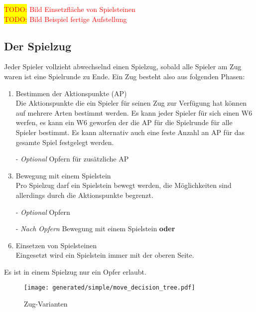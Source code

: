 \documentclass{article}
\newcommand{\todo}[1]{\textcolor{red}{\colorbox{yellow}{TODO:} #1\\}}
\begin{document}
	\todo{Bild Einsetzfläche von Spielsteinen}
	\todo{Bild Beispiel fertige Aufstellung}
	
\subsection{Der Spielzug}

	
	Jeder Spieler vollzieht abwechselnd einen Spielzug, sobald alle Spieler am Zug waren
	ist eine Spielrunde zu Ende. Ein Zug besteht also aus folgenden Phasen:

	
	
	\begin{enumerate}
	\item Bestimmen der Aktionspunkte (AP) \\
		  Die Aktionspunkte die ein Spieler für seinen Zug zur Verfügung hat können auf mehrere Arten bestimmt werden.
		  Es kann jeder Spieler für sich einen W6 werfen, es kann ein W6 geworfen der die AP für die Spielrunde für alle Spieler bestimmt.
		  Es kann alternativ auch eine feste Anzahl an AP für das gesamte Spiel festgelegt werden.

	\item[-] \textit{Optional} Opfern für zusätzliche AP
		  
	\item Bewegung mit einem Spielstein \\
		  Pro Spielzug darf ein Spielstein bewegt werden, die Möglichkeiten sind allerdings durch die Aktionspunkte begrenzt.
	
	\item[-] \textit{Optional}  Opfern
	
	\item[-] \textit{Nach Opfern} Bewegung mit einem Spielstein \textbf{oder} 
			  
	\item Einsetzen von Spielsteinen \\
		  Eingesetzt wird ein Spielstein immer mit der oberen Seite.
		  
	\end{enumerate}
	
	Es ist in einem Spielzug nur ein Opfer erlaubt.
	
	\begin{wrapfigure}{l}{6.2cm}
  	\texttt{[image: generated/simple/move\_decision\_tree.pdf]}
  	\caption{Zug-Varianten}
	\end{wrapfigure}
	
\end{document}
